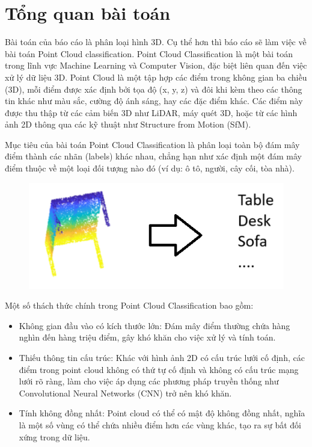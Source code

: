 \section{Tổng quan bài toán}
Bài toán của báo cáo là phân loại hình 3D. Cụ thể hơn thì báo cáo sẽ làm việc về bài toán Point Cloud classification. Point Cloud Classification là một bài toán trong lĩnh vực Machine Learning và Computer Vision, đặc biệt liên quan đến việc xử lý dữ liệu 3D. Point Cloud là một tập hợp các điểm trong không gian ba chiều (3D), mỗi điểm được xác định bởi tọa độ (x, y, z) và đôi khi kèm theo các thông tin khác như màu sắc, cường độ ánh sáng, hay các đặc điểm khác. Các điểm này được thu thập từ các cảm biến 3D như LiDAR, máy quét 3D, hoặc từ các hình ảnh 2D thông qua các kỹ thuật như Structure from Motion (SfM).

Mục tiêu của bài toán Point Cloud Classification là phân loại toàn bộ đám mây điểm thành các nhãn (labels) khác nhau, chẳng hạn như xác định một đám mây điểm thuộc về một loại đối tượng nào đó (ví dụ: ô tô, người, cây cối, tòa nhà).

\begin{figure}[H]
    \centering
    \includegraphics[width=0.7\linewidth]{Images/tong_quan_bt.png}
\end{figure}

Một số thách thức chính trong Point Cloud Classification bao gồm:
\begin{itemize}
    \item Không gian đầu vào có kích thước lớn: Đám mây điểm thường chứa hàng nghìn đến hàng triệu điểm, gây khó khăn cho việc xử lý và tính toán.

    \item Thiếu thông tin cấu trúc: Khác với hình ảnh 2D có cấu trúc lưới cố định, các điểm trong point cloud không có thứ tự cố định và không có cấu trúc mạng lưới rõ ràng, làm cho việc áp dụng các phương pháp truyền thống như Convolutional Neural Networks (CNN) trở nên khó khăn.

    \item Tính không đồng nhất: Point cloud có thể có mật độ không đồng nhất, nghĩa là một số vùng có thể chứa nhiều điểm hơn các vùng khác, tạo ra sự bất đối xứng trong dữ liệu.

\end{itemize}


